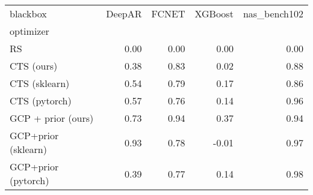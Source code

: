 \begin{tabular}{lrrrr}
\toprule
blackbox &  DeepAR &  FCNET &  XGBoost &  nas\_bench102 \\
optimizer           &         &        &          &               \\
\midrule
RS                  &    0.00 &   0.00 &     0.00 &          0.00 \\
CTS (ours)          &    0.38 &   0.83 &     0.02 &          0.88 \\
CTS (sklearn)       &    0.54 &   0.79 &     0.17 &          0.86 \\
CTS (pytorch)       &    0.57 &   0.76 &     0.14 &          0.96 \\
GCP + prior (ours)  &    0.73 &   0.94 &     0.37 &          0.94 \\
GCP+prior (sklearn) &    0.93 &   0.78 &    -0.01 &          0.97 \\
GCP+prior (pytorch) &    0.39 &   0.77 &     0.14 &          0.98 \\
\bottomrule
\end{tabular}
